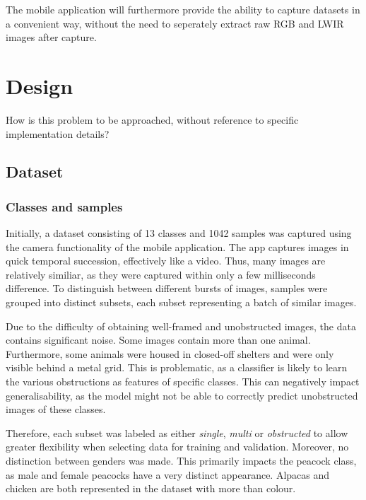 \documentclass{l4proj}
\begin{document}
The mobile application will furthermore provide the ability to capture datasets in a convenient way, without the need to seperately extract raw RGB and LWIR images after capture.



\chapter{Design}
How is this problem to be approached, without reference to specific implementation details? 


\section{Dataset}

\subsection{Classes and samples}
\label{classes_samples}

Initially, a dataset consisting of 13 classes and 1042 samples was captured using the camera functionality of the mobile application. The app captures images in quick temporal succession, effectively like a video. Thus, many images are relatively similiar, as they were captured within only a few milliseconds difference. To distinguish between different bursts of images, samples were grouped into distinct subsets, each subset representing a batch of similar images.

Due to the difficulty of obtaining well-framed and unobstructed images, the data contains significant noise. Some images contain more than one animal. Furthermore, some animals were housed in closed-off shelters and were only visible behind a metal grid. This is problematic, as a classifier is likely to learn the various obstructions as features of specific classes. This can negatively impact generalisability, as the model might not be able to correctly predict unobstructed images of these classes.

Therefore, each subset was labeled as either \textit{single}, \textit{multi} or \textit{obstructed} to allow greater flexibility when selecting data for training and validation. Moreover, no distinction between genders was made. This primarily impacts the peacock class, as male and female peacocks have a very distinct appearance. Alpacas and chicken are both represented in the dataset with more than colour.
\end{document}
